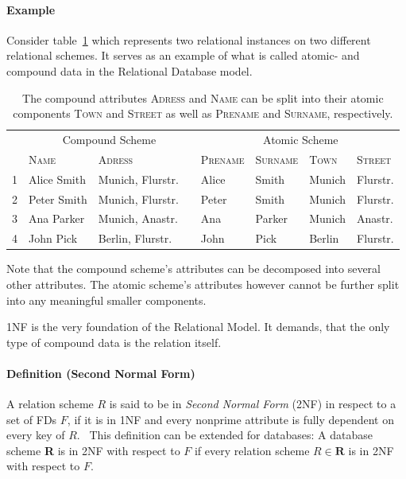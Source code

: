 \paragraph{Example}Consider table~\ref{tab:first-normal-form} which represents two relational instances on two different relational schemes.
It serves as an example of what is called atomic- and compound data in the Relational Database model.~\cite[p.~6]{COD90}

\begin{table}[ht]
    \centering
    \begin{tabular}{rlllllll}\toprule
    & \multicolumn{3}{c}{Compound Scheme} & & \multicolumn{2}{c}{Atomic Scheme} \\
    \cmidrule{2-3} \cmidrule{5-8}
    & \textsc{Name} & \textsc{Adress} && \textsc{Prename} & \textsc{Surname} & \textsc{Town} & \textsc{Street}   \\ \midrule
1 & Alice Smith & Munich, Flurstr. && Alice & Smith & Munich & Flurstr. \\
2 & Peter Smith & Munich, Flurstr. && Peter & Smith & Munich & Flurstr. \\
3 & Ana Parker & Munich, Anastr. && Ana & Parker & Munich & Anastr. \\
4 & John Pick & Berlin, Flurstr. && John & Pick & Berlin & Flurstr. \\
\bottomrule
\end{tabular}
\caption{The compound attributes \textsc{Adress} and \textsc{Name} can be split into their atomic components \textsc{Town} and \textsc{Street} as well as \textsc{Prename} and \textsc{Surname}, respectively.}\label{tab:first-normal-form}
\end{table}
Note that the compound scheme's attributes can be decomposed into several other attributes.
The atomic scheme's attributes however cannot be further split into any meaningful smaller components.

1NF is the very foundation of the Relational Model. It demands, that the only type of compound data is the relation itself.~\cite[p.~6]{COD90}

\paragraph{Definition (Second Normal Form)} A relation scheme \(R\) is said to be in \emph{Second Normal Form} (2NF) in respect to a set of FDs \(F\), if it is in 1NF and every nonprime attribute is fully dependent on every key of \(R\).~\cite[p.~99]{MAI83}
This definition can be extended for databases: A database scheme \textbf{R} is in 2NF with respect to \(F\) if every relation scheme \(R \in \textbf{R} \) is in 2NF with respect to \(F\).

